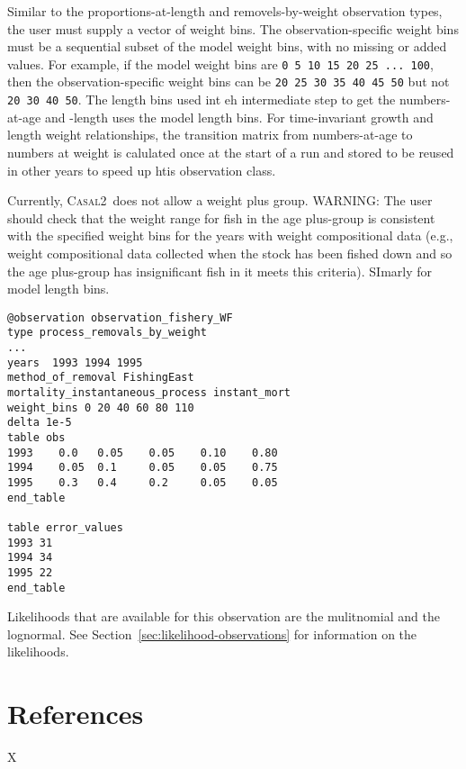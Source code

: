 \documentclass[a4paper,11pt,twoside,pdftex,draft]{article}
\newcommand{\CNAME}{\textsc{Casal2}}
\begin{document}
Similar to the proportions-at-length and removels-by-weight observation types, the user must supply a vector of weight bins. The observation-specific weight bins must be a sequential subset of the model weight bins, with no missing or added values. For example, if the model weight bins are \texttt{0 5 10 15 20 25 ... 100}, then the observation-specific weight bins can be \texttt{20 25 30 35 40 45 50} but not \texttt{20 30 40 50}. The length bins used int eh intermediate step to get the numbers-at-age and -length uses the model length bins. For time-invariant growth and length weight relationships, the transition matrix from numbers-at-age to numbers at weight is calulated once at the start of a run and stored to be reused in other years to speed up htis observation class.

Currently, \CNAME~does not allow a weight plus group. WARNING: The user should check that the weight range for fish in the age plus-group is consistent with the specified weight bins for the years with weight compositional data (e.g., weight compositional data collected when the stock has been fished down and so the age plus-group has insignificant fish in it meets this criteria). SImarly for model length bins.

{\small{\begin{verbatim}
@observation observation_fishery_WF
type process_removals_by_weight
...
years  1993 1994 1995
method_of_removal FishingEast
mortality_instantaneous_process instant_mort
weight_bins 0 20 40 60 80 110
delta 1e-5
table obs
1993    0.0   0.05    0.05    0.10    0.80
1994    0.05  0.1     0.05    0.05    0.75
1995    0.3   0.4     0.2     0.05    0.05
end_table

table error_values
1993 31
1994 34
1995 22
end_table
\end{verbatim}}}

Likelihoods that are available for this observation are the mulitnomial and the lognormal. See Section~\ref{sec:likelihood-observations} for information on the  likelihoods.

\section{References}

X
\end{document}
